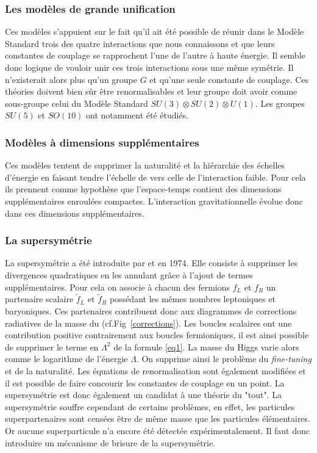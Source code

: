 \subsubsection{Les modèles de grande unification}
Ces modèles s'appuient sur le fait qu'il ait été possible de réunir dans le Modèle Standard trois des quatre interactions que nous connaissons et que leurs constantes de couplage se rapprochent l'une de l'autre à haute énergie. Il semble donc logique de vouloir unir ces trois interactions sous une même symétrie. Il n'existerait alors plus qu'un groupe $G$ et qu'une seule constante de couplage. Ces théories doivent bien sûr être renormalisables et leur groupe doit avoir comme sous-groupe celui du Modèle Standard $SU(3)\otimes SU(2) \otimes U(1)$. Les groupes $SU(5)$ et $SO(10)$ ont notamment été étudiés.

\subsubsection{Modèles à dimensions supplémentaires}
Ces modèles tentent de supprimer la naturalité et la hiérarchie des échelles d'énergie en faisant tendre l'échelle de  vers celle de l'interaction faible. Pour cela ils prennent comme hypothèse que l'espace-temps contient des dimensions supplémentaires enroulées compactes. L'interaction gravitationnelle évolue donc dans ces dimensions supplémentaires.

\subsubsection{La supersymétrie}
La supersymétrie a été introduite par  et  en \num{1974}. Elle consiste à supprimer les divergences quadratiques en les annulant grâce à l'ajout de termes supplémentaires. Pour cela on associe à chacun des fermions $f_{L}$ et $f_{R}$ un partenaire scalaire $\tilde{f}_{L}$ et $\tilde{f}_{R}$ possédant les mêmes nombres leptoniques et baryoniques. Ces partenaires contribuent donc aux diagrammes de corrections radiatives de la masse du  (cf.Fig~\ref{corrections}). Les boucles scalaires ont une contribution positive contrairement aux boucles fermioniques, il est ainsi possible de supprimer le terme en $\Lambda^2$ de la formule \ref{eq1}. La masse du Higgs varie alors comme le logarithme de l'énergie $\Lambda$. On supprime ainsi le problème du \textit{fine-tuning} et de la naturalité. Les équations de renormalisation sont également modifiées et il est possible de faire concourir les constantes de couplage en un point. La supersymétrie est donc également un candidat à une théorie du "tout". La supersymétrie souffre cependant de certains problèmes, en effet, les particules superpartenaires sont censées être de même masse que les particules élémentaires. Or aucune superparticule n'a encore été détectée expérimentalement. Il faut donc introduire un mécanisme de brisure de la supersymétrie.

